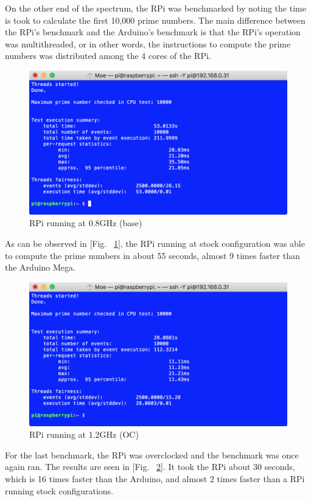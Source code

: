 On the other end of the spectrum, the RPi was benchmarked by noting the time is took to calculate the first 10,000 prime numbers. The main difference between the RPi's benchmark and the Arduino's benchmark is that the RPi's operation was multithreaded, or in other words, the instructions to compute the prime numbers was distributed among the 4 cores of the RPi.

\begin{figure}[H]
 \centering
 \includegraphics[width=0.85\linewidth]{Controls/RPi_Base.png}
 \caption{\label{fig:RPi_Base}RPi running at 0.8GHz (base)} 
\end{figure}

As can be observed in [Fig. ~\ref{fig:RPi_Base}], the RPi running at stock configuration was able to compute the prime numbers in about 55 seconds, almost 9 times faster than the Arduino Mega.

\begin{figure}[H]
 \centering
 \includegraphics[width=0.85\linewidth]{Controls/RPi_OC.png}
 \caption{\label{fig:RPi_OC}RPi running at 1.2GHz (OC)}
\end{figure}

For the last benchmark, the RPi was overclocked and the benchmark was once again ran. The results are seen in [Fig. ~\ref{fig:RPi_OC}]. It took the RPi about 30 seconds, which is 16 times faster than the Arduino, and almost 2 times faster than a RPi running stock configurations.

